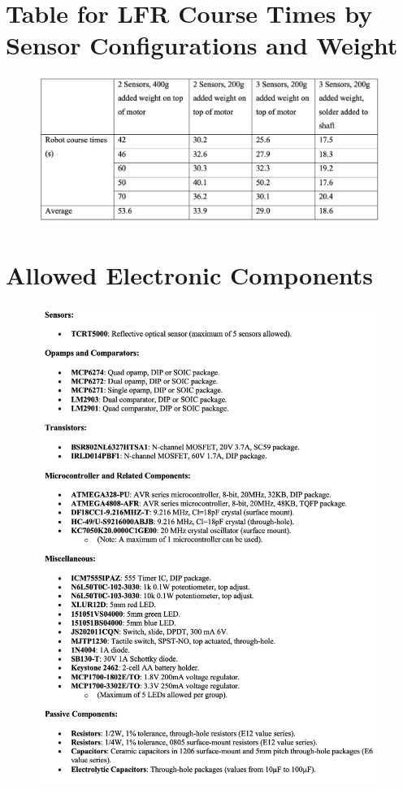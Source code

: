 \section{Table for LFR Course Times by Sensor Configurations and Weight}
\begin{figure}[H]
    \centering
    \includegraphics[width=0.8\linewidth]{REPORT/Screenshot 2024-10-20 at 3.11.46 AM.png}
\end{figure}

\section{Allowed Electronic Components}
\begin{figure}[H]
    \centering
    \includegraphics[width=0.8\linewidth]{REPORT/Screenshot 2024-10-20 at 3.10.45 PM.png}
\end{figure}